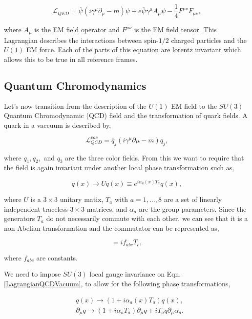  \begin{equation}\label{LagrangianQED}
\mathcal{L}_{QED}=\overline{\psi}(i\gamma^\mu\partial_\mu-m)\psi+e\overline{\psi}\gamma^{\mu}A_{\mu}\psi-\frac{1}{4}F^{\mu\nu}F_{\mu\nu},
 \end{equation}

where $A_{\mu}$ is the EM field operator and $F^{\mu\nu}$ is the EM field tensor. This Lagrangian describes the interactions between spin-$1/2$ charged particles and the $U(1)$ EM force. Each of the parts of this equation are lorentz invariant which allows this to be true in all reference frames. 

\subsection{Quantum Chromodynamics}

Let's now transition from the description of the $U(1)$ EM field to the $SU(3)$ Quantum Chromodynamic (QCD) field and the transformation of quark fields. A quark in a vaccuum is described by,

\begin{equation}\label{LagrangianQCDVacuum}
\mathcal{L}_{QCD}^{vac}=\overline{q}_j(i\gamma^\mu\partial\mu-m)q_j,
\end{equation}

where $q_1, q_2,$ and $q_3$ are the three color fields. From this we want to require that the field is again invariant under another local phase transformation such as,

\begin{equation}
q(x)\rightarrow Uq(x)\equiv e^{i\alpha_a(x)T_a}q(x),
\end{equation}

where $U$ is a $3\times3$ unitary matix, $T_a$ with $a=1,\ldots,8$ are a set of linearly independent traceless $3\times3$ matrices, and $\alpha_a$ are the group parameters. Since the generators $T_a$ do not necessarily commute with each other, we can see that it is a non-Abelian transformation and the commutator can be represented as,

\begin{equation}
[T_a, T_b]=if_{abc}T_c,
\end{equation}

where $f_{abc}$ are constants. 

We need to impose $SU(3)$ local gauge invariance on Eqn. \ref{LagrangianQCDVacuum}, to allow for the following phase transformations,

\begin{equation}
\begin{split}
& q(x)\rightarrow(1+i\alpha_a(x)T_a)q(x), \\
& \partial_\mu q\rightarrow(1+i\alpha_aT_a)\partial_\mu q+iT_aq\partial_\mu\alpha_a.
\end{split}
\end{equation}

